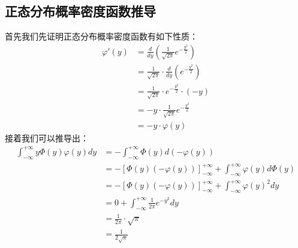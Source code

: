 \documentclass[UTF8]{ctexart}
\begin{document}
\subsection*{正态分布概率密度函数推导}
首先我们先证明正态分布概率密度函数有如下性质：
$$
\begin{align*}
    \varphi'(y) &= \frac{d}{dy}\left(\frac{1}{\sqrt{2\pi}}e^{-\frac{y^2}{2}}\right) \\
    &= \frac{1}{\sqrt{2\pi}} \cdot \frac{d}{dy}\left(e^{-\frac{y^2}{2}}\right) \\
    &= \frac{1}{\sqrt{2\pi}} \cdot e^{-\frac{y^2}{2}} \cdot \left(-y\right) \\
    &= -y \cdot \frac{1}{\sqrt{2\pi}}e^{-\frac{y^2}{2}} \\
    &= -y \cdot \varphi(y)
\end{align*}
$$
接着我们可以推导出：
$$
\begin{align*}
    \int_{-\infty}^{+\infty} y\Phi(y)\varphi(y)dy
    &= -\int_{-\infty}^{+\infty} \Phi(y)d(-\varphi(y)) \\
    &= -\left[\Phi(y)(-\varphi(y))\right]_{-\infty}^{+\infty} + \int_{-\infty}^{+\infty} \varphi(y)d\Phi(y) \\
    &= -\left[\Phi(y)(-\varphi(y))\right]_{-\infty}^{+\infty} + \int_{-\infty}^{+\infty} \varphi(y)^2 dy \\
    &= 0 + \int_{-\infty}^{+\infty} \frac{1}{2\pi}e^{-y^2} dy \\
    &= \frac{1}{2\pi} \cdot \sqrt{\pi} \\
    &= \frac{1}{2\sqrt{\pi}}
\end{align*}
$$
\end{document}
